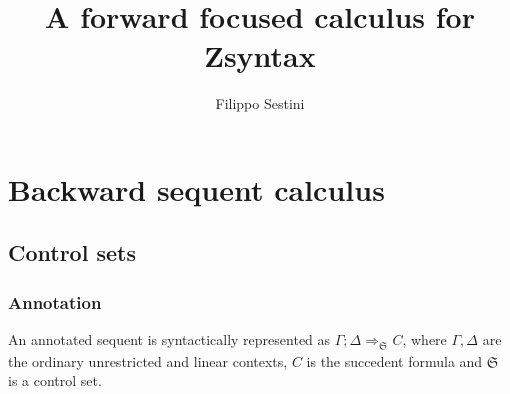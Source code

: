 \documentclass{article}
\title{A forward focused calculus for Zsyntax}
\author{Filippo Sestini}
\theoremstyle{definition}
\newcommand{\ctrlset}[1]{\mathfrak{S}_{#1}}
\begin{document}
\maketitle
\tableofcontents

\section{Backward sequent calculus}

\subsection{Control sets}

\subsubsection{Annotation}

\begin{definition}
  An annotated sequent is syntactically represented as $\Gamma; \Delta
  \Longrightarrow_{\ctrlset{}} C$, where $\Gamma, \Delta$ are the ordinary
  unrestricted and linear contexts, $C$ is the succedent formula and
  $\ctrlset{}$ is a control set.
\end{definition}
\end{document}
